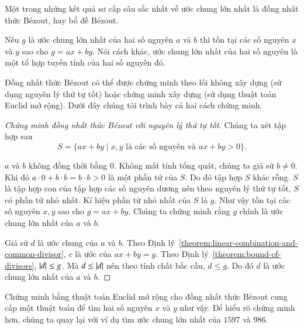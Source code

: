 Một trong những kết quả sơ cấp sâu sắc nhất về ước chung lớn nhất là đồng nhất thức B\'{e}zout, hay bổ đề B\'{e}zout.

\begin{theorem}
    Nếu $g$ là ước chung lớn nhất của hai số nguyên $a$ và $b$ thì tồn tại các số nguyên $x$ và $y$ sao cho $g = a x + b y$. Nói cách khác, ước chung lớn nhất của hai số nguyên là một tổ hợp tuyến tính của hai số nguyên đó.
\end{theorem}

Đồng nhất thức B\'{e}zout có thể được chứng minh theo lối không xây dựng (sử dụng nguyên lý thứ tự tốt) hoặc chứng minh xây dựng (sử dụng thuật toán Euclid mở rộng). Dưới đây chúng tôi trình bày cả hai cách chứng minh.

\begin{proof}[Chứng minh đồng nhất thức B\'{e}zout với nguyên lý thứ tự tốt]
    Chúng ta xét tập hợp sau
    \[
        S = \{ a x + b y \mid \text{$x, y$ là các số nguyên và $a x + b y > 0$} \}.
    \]

    $a$ và $b$ không đồng thời bằng $0$. Không mất tính tổng quát, chúng ta giả sử $b\ne 0$. Khi đó $a\cdot 0 + b\cdot b = b\cdot b > 0$ là một phần tử của $S$. Do đó tập hợp $S$ khác rỗng. $S$ là tập hợp con của tập hợp các số nguyên dương nên theo nguyên lý thứ tự tốt, $S$ có phần tử nhỏ nhất. Kí hiệu phần tử nhỏ nhất của $S$ là $g$. Như vậy tồn tại các số nguyên $x, y$ sao cho $g = a x + b y$. Chúng ta chứng minh rằng $g$ chính là ước chung lớn nhất của $a$ và $b$.

    Giả sử $d$ là ước chung của $a$ và $b$. Theo Định lý~\ref{theorem:linear-combination-and-common-divisor}, $c$ là ước của $a x + b y = g$. Theo Định lý~\ref{theorem:bound-of-divisors}, $\left\vert{d}\right\vert\leq g$. Mà $d\leq \left\vert{d}\right\vert$ nên theo tính chất bắc cầu, $d\leq g$. Do đó $d$ là ước chung lớn nhất của $a$ và $b$.
\end{proof}

Chứng minh bằng thuật toán Euclid mở rộng cho đồng nhất thức B\'{e}zout cung cấp một thuật toán để tìm hai số nguyên $x$ và $y$ như vậy. Để hiểu rõ chứng minh hơn, chúng ta quay lại với ví dụ tìm ước chung lớn nhất của $1597$ và $986$.

